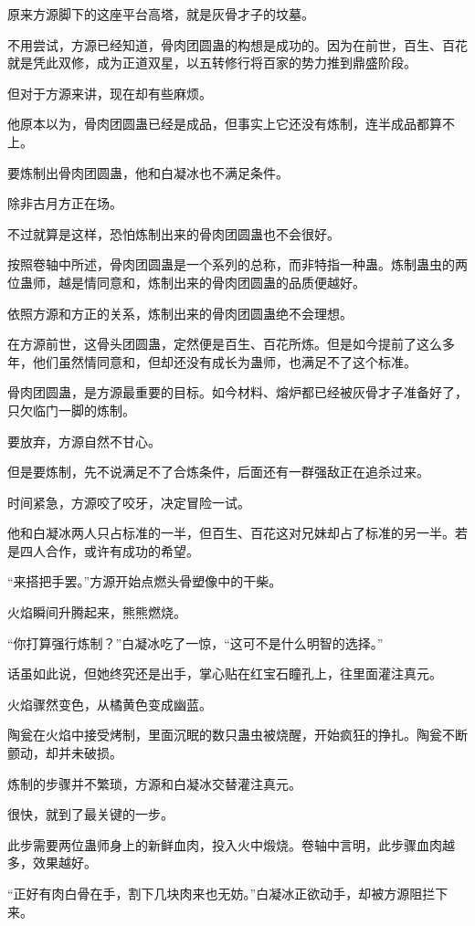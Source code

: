\begin{this_body}
原来方源脚下的这座平台高塔，就是灰骨才子的坟墓。

不用尝试，方源已经知道，骨肉团圆蛊的构想是成功的。因为在前世，百生、百花就是凭此双修，成为正道双星，以五转修行将百家的势力推到鼎盛阶段。

但对于方源来讲，现在却有些麻烦。

他原本以为，骨肉团圆蛊已经是成品，但事实上它还没有炼制，连半成品都算不上。

要炼制出骨肉团圆蛊，他和白凝冰也不满足条件。

除非古月方正在场。

不过就算是这样，恐怕炼制出来的骨肉团圆蛊也不会很好。

按照卷轴中所述，骨肉团圆蛊是一个系列的总称，而非特指一种蛊。炼制蛊虫的两位蛊师，越是情同意和，炼制出来的骨肉团圆蛊的品质便越好。

依照方源和方正的关系，炼制出来的骨肉团圆蛊绝不会理想。

在方源前世，这骨头团圆蛊，定然便是百生、百花所炼。但是如今提前了这么多年，他们虽然情同意和，但却还没有成长为蛊师，也满足不了这个标准。

骨肉团圆蛊，是方源最重要的目标。如今材料、熔炉都已经被灰骨才子准备好了，只欠临门一脚的炼制。

要放弃，方源自然不甘心。

但是要炼制，先不说满足不了合炼条件，后面还有一群强敌正在追杀过来。

时间紧急，方源咬了咬牙，决定冒险一试。

他和白凝冰两人只占标准的一半，但百生、百花这对兄妹却占了标准的另一半。若是四人合作，或许有成功的希望。

“来搭把手罢。”方源开始点燃头骨塑像中的干柴。

火焰瞬间升腾起来，熊熊燃烧。

“你打算强行炼制？”白凝冰吃了一惊，“这可不是什么明智的选择。”

话虽如此说，但她终究还是出手，掌心贴在红宝石瞳孔上，往里面灌注真元。

火焰骤然变色，从橘黄色变成幽蓝。

陶瓮在火焰中接受烤制，里面沉眠的数只蛊虫被烧醒，开始疯狂的挣扎。陶瓮不断颤动，却并未破损。

炼制的步骤并不繁琐，方源和白凝冰交替灌注真元。

很快，就到了最关键的一步。

此步需要两位蛊师身上的新鲜血肉，投入火中煅烧。卷轴中言明，此步骤血肉越多，效果越好。

“正好有肉白骨在手，割下几块肉来也无妨。”白凝冰正欲动手，却被方源阻拦下来。


\end{this_body}
